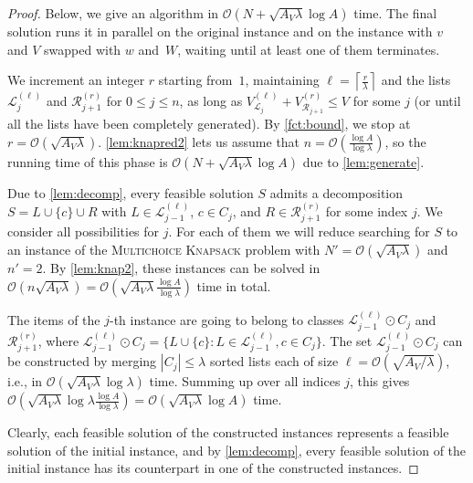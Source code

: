 \documentclass{article}
\theoremstyle{plain}
\theoremstyle{definition}
\newcommand{\MK}{\textsc{Multichoice Knapsack}\xspace}
\newcommand{\ceil}[1]{\left\lceil #1 \right\rceil}
\newcommand{\Oh}{\mathcal{O}}
\renewcommand{\L}{\mathcal{L}}
\newcommand{\R}{\mathcal{R}}
\begin{document}
  \begin{proof}
  Below, we give an algorithm in $\Oh(N+\sqrt{A_V\lambda}\log A)$ time. 
  The final solution runs it in parallel on the original instance and on the instance with $v$ and $V$ swapped with $w$ and~$W$,
   waiting until at least one of them terminates.
    
    We increment an integer $r$ starting from~$1$, maintaining $\ell=\ceil{\frac{r}{\lambda}}$ and the lists $\L_{j}^{(\ell)}$ and $\R_{j+1}^{(r)}$ for $0\le j \le n$, as long as $V^{(\ell)}_{\L_j}+V^{(r)}_{\R_{j+1}}\le V$ for some $j$ (or until all the lists have been completely generated).
    By \cref{fct:bound}, we stop at $r=\Oh(\sqrt{A_V  \lambda})$.
    \cref{lem:knapred2} lets us assume that $n=\Oh(\frac{\log A}{\log \lambda})$, so  
    the running time of this phase is $\Oh(N+\sqrt{A_V  \lambda}\log A)$ due to \cref{lem:generate}.
    
    
    Due to \cref{lem:decomp}, every feasible solution $S$ admits a decomposition $S=L\cup\{c\}\cup R$
    with $L\in \L_{j-1}^{(\ell)}$, $c\in C_j$, and $R\in \R_{j+1}^{(r)}$ for some index $j$. 
    We consider all possibilities for $j$. For each of them we will reduce searching for $S$ to an instance of the \MK
    problem with $N'=\Oh(\sqrt{A_V\lambda})$ and $n'=2$. By \cref{lem:knap2}, these instances can be solved in $\Oh(n\sqrt{A_V\lambda})=\Oh(\sqrt{A_V\lambda}\frac{\log A}{\log \lambda})$  time in total.
   
    The items of the $j$-th instance are going to belong to classes $\L_{j-1}^{(\ell)}\odot C_j$ and $\R_{j+1}^{(r)}$,
    where $\L_{j-1}^{(\ell)}\odot C_j = \{L\cup \{c\} : L\in \L_{j-1}^{(\ell)} , c\in C_j\}$.
    The set $\L_{j-1}^{(\ell)}\odot C_j$ can be constructed by merging $|C_j|\le \lambda$ sorted lists each of size $\ell=\Oh(\sqrt{A_V/\lambda})$,
    i.e., in $\Oh(\sqrt{A_V\lambda}\log \lambda)$ time.
    Summing up over all indices $j$, this gives $\Oh(\sqrt{A_V \lambda}\log\lambda \frac{\log A}{\log \lambda})=\Oh(\sqrt{A_V \lambda}\log A)$ time.
       
    Clearly, each feasible solution of the constructed instances represents a feasible solution of the initial instance,
    and by \cref{lem:decomp}, every feasible solution of the initial instance has its counterpart in one of the constructed instances. 
  \end{proof}
 
\end{document}
